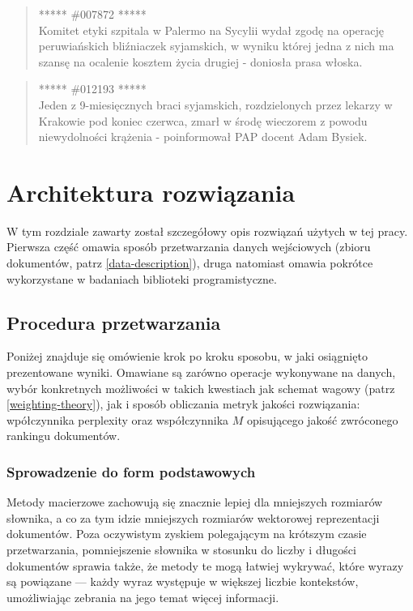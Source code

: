 \documentclass[11pt,a4paper]{article}
\begin{document}
\begin{quote} ***** \#007872 *****\\ Komitet etyki szpitala w Palermo na Sycylii
wydał zgodę na operację peruwiańskich bliźniaczek syjamskich, w wyniku której
jedna z nich ma szansę na ocalenie kosztem życia drugiej - doniosła prasa
włoska.  \end{quote}

\begin{quote} ***** \#012193 *****\\ Jeden z 9-miesięcznych braci syjamskich,
rozdzielonych przez lekarzy w Krakowie pod koniec czerwca, zmarł w środę
wieczorem z powodu niewydolności krążenia - poinformował PAP docent Adam
Bysiek.  \end{quote}

\pagebreak

\section{Architektura rozwiązania}
\label{sec:solution}

W tym rozdziale zawarty został szczegółowy opis rozwiązań użytych w tej pracy.
Pierwsza część omawia sposób przetwarzania danych wejściowych (zbioru
dokumentów, patrz \ref{data-description}), druga natomiast omawia pokrótce
wykorzystane w badaniach biblioteki programistyczne.

\subsection{Procedura przetwarzania}

Poniżej znajduje się omówienie krok po kroku sposobu, w jaki osiągnięto
prezentowane wyniki. Omawiane są zarówno operacje wykonywane na danych, wybór
konkretnych możliwości w takich kwestiach jak schemat wagowy (patrz
\ref{weighting-theory}), jak i sposób obliczania metryk jakości rozwiązania:
wpółczynnika perplexity oraz współczynnika $M$ opisującego
jakość zwróconego rankingu dokumentów.

\subsubsection{Sprowadzenie do form podstawowych}

Metody macierzowe zachowują się znacznie lepiej dla mniejszych rozmiarów
słownika, a co za tym idzie mniejszych rozmiarów wektorowej reprezentacji
dokumentów. Poza oczywistym zyskiem polegającym na krótszym czasie
przetwarzania, pomniejszenie słownika w stosunku do liczby i długości
dokumentów sprawia także, że metody te mogą łatwiej wykrywać, które wyrazy są
powiązane --- każdy wyraz występuje w większej liczbie kontekstów, umożliwiając
zebrania na jego temat więcej informacji.
\end{document}
